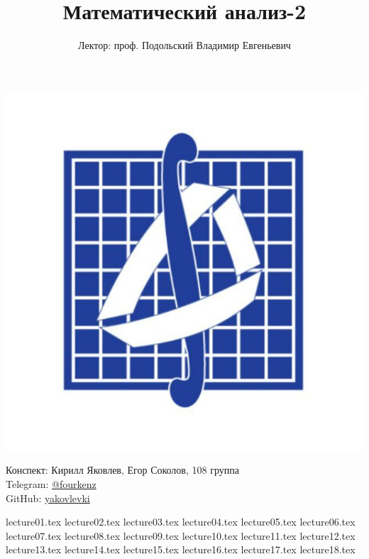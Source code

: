 \documentclass[a4paper, 12pt]{article}
\title{\textbf{Математический анализ-2}}
\author{Лектор: проф. Подольский Владимир Евгеньевич}
\begin{document}
    
\fontsize{14pt}{20pt}\selectfont
\maketitle
\vspace{0.3cm}
\begin{center}
    \includegraphics[width=0.75\linewidth]{Images/mehmat.png}
\end{center}
\vspace{1.5cm}
\begin{center}
    Конспект: Кирилл Яковлев, Егор Соколов, 108 группа\\
    Telegram: \href{https://t.me/fourkenz}{@fourkenz}\\
    GitHub: \href{https://github.com/yakovlevki}{yakovlevki}\\
\end{center}
    
\newpage
\tableofcontents
\newpage

{lecture01.tex}
{lecture02.tex}
{lecture03.tex}
{lecture04.tex}
{lecture05.tex}
{lecture06.tex}
{lecture07.tex}
{lecture08.tex}
{lecture09.tex}
{lecture10.tex}
{lecture11.tex}
{lecture12.tex}
{lecture13.tex}
{lecture14.tex}
{lecture15.tex}
{lecture16.tex}
{lecture17.tex}
{lecture18.tex}
\end{document}

